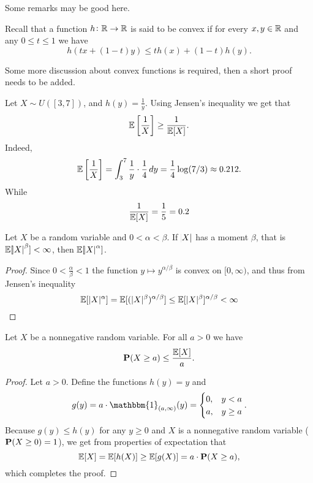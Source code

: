 \documentclass[11pt,a4paper]{article}
\begin{document}
  Some remarks may be good here.

  Recall that a function $h \colon \mathbb{R} \to \mathbb{R}$ is said to be convex if for
  every $x,y \in \mathbb{R}$ and any $0 \le t \le 1$ we have
  \[
    h(t x+(1-t)y)\leq t h(x)+(1-t)h(y).
  \]

  Some more discussion about convex functions is required, then a short
  proof needs to be added.

  \begin{example}
    Let $X \sim U([3,7])$, and $h(y) = \frac{1}{y}$. Using Jensen's inequality
    we get that
    \[
      \mathbb{E}\left[{\frac{1}{X}}\right]\geq{\frac{1}{\mathbb{E}[X]}}.
    \]
    Indeed,
    \[
      \mathbb{E} \left[{\frac{1}{X}}\right] =
      \int_{3}^{7}{\frac{1}{y}}\cdot{\frac{1}{4}}\,dy =
      \frac{1}{4} \log(7/3) \approx
      0.212.
    \]
    While
    \[
      \frac{1}{\mathbb{E}[X]} = \frac{1}{5} = 0.2
    \]
  \end{example}
  
  \begin{corollary}
    Let $X$ be a random variable and $0 < \alpha < \beta$. 
    If $\abs{X}$ has a moment $\beta$, 
    that is $\mathbb{E}[\abs{X}^{\beta}] < \infty$,
    then $\mathbb{E}[\abs{X}^{\alpha}]$.
  \end{corollary}
  \begin{proof}
    Since $0 < \frac{\alpha}{\beta} < 1$ the function 
    $y \mapsto y^{\alpha/\beta}$ is convex on $[0,\infty)$, and thus from
    Jensen's inequality
    \[
      \mathbb{E}[|X|^{\alpha}] =
      \mathbb{E}[(|X|^{\beta})^{\alpha/\beta}] \leq
      \mathbb{E}[|X|^{\beta}]^{\alpha/\beta} <
      \infty
    \]
  \end{proof}

  \begin{theorem}
    Let $X$ be a nonnegative random variable. For all $a > 0$ we have
    \[
      \mathbf{P}(X \geq a) \leq
      \frac{\mathbb{E}[X]}{a}.
    \]
  \end{theorem}
  \begin{proof}
    Let $a > 0$. Define the functions $h(y) = y$ and
    \[
      g(y) =
      a \cdot \mathbbm{1}_{(a,\infty)}(y) =
      \begin{cases}
        0, &y < a \\
        a, &y \geq a
      \end{cases}.
    \]
    Because $g(y) \le h(y)$ for any $y \geq 0$ and $X$ is a nonnegative
    random variable ($\mathbf{P}(X \geq 0) = 1$), we get from properties
    of expectation that
    \[
      \mathbb{E}[X] =
      \mathbb{E}[h(X)] \geq
      \mathbb{E}[g(X)] =
      a \cdot \mathbf{P}(X \geq a),
    \]
    which completes the proof.
  \end{proof}
\end{document}
